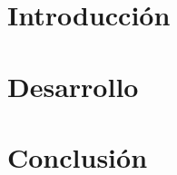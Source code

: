 \documentclass[12pt,a4paper]{report}
\begin{document}
 
\tableofcontents
\clearpage



 \thispagestyle{fancy}

 
\section{Introducción}
\lipsum[1-2]
\clearpage
\section{Desarrollo}
\lipsum[3-4]
\clearpage
\section{Conclusión}
\lipsum[5-6]

   
   
\end{document}
